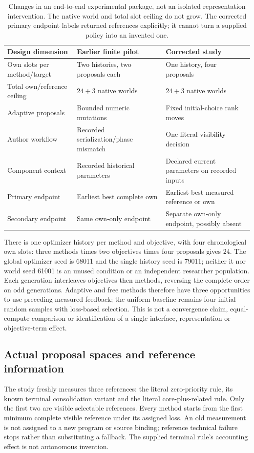 \begin{table}[t]
\centering\small
\setlength{\tabcolsep}{4pt}
\begin{tabular}{>{\raggedright\arraybackslash}p{.28\linewidth}>{\raggedright\arraybackslash}p{.31\linewidth}>{\raggedright\arraybackslash}p{.31\linewidth}}
\toprule
Design dimension & Earlier finite pilot & Corrected study\\
\midrule
Own slots per method/target & Two histories, two proposals each & One history, four proposals\\
Total own/reference ceiling & $24+3$ native worlds & $24+3$ native worlds\\
Adaptive proposals & Bounded numeric mutations & Fixed initial-choice rank moves\\
Author workflow & Recorded serialization/phase mismatch & One literal visibility decision\\
Component context & Recorded historical parameters & Declared current parameters on recorded inputs\\
Primary endpoint & Earliest best complete own & Earliest best measured reference or own\\
Secondary endpoint & Same own-only endpoint & Separate own-only endpoint, possibly absent\\
\bottomrule
\end{tabular}
\caption{Changes in an end-to-end experimental package, not an isolated
representation intervention. The native world and total slot ceiling do not
grow. The corrected primary endpoint labels returned references explicitly;
it cannot turn a supplied policy into an invented one.}
\label{tab:corrected-choice-design}
\end{table}

There is one optimizer history per method and objective, with four chronological
own slots: three methods times two objectives times four proposals gives 24.
The global optimizer seed is 68011 and the single history seed is 79011;
neither it nor world seed 61001 is an unused condition or an independent
researcher population. Each generation interleaves objectives then methods,
reversing the complete order on odd generations. Adaptive and free methods
therefore have three opportunities to use preceding measured feedback; the
uniform baseline remains four initial random samples with loss-based selection.
This is not a convergence claim, equal-compute comparison or identification
of a single interface, representation or objective-term effect.

\subsection{Actual proposal spaces and reference information}
The study freshly measures three references: the literal zero-priority rule,
its known terminal consolidation variant and the literal core-plus-related
rule. Only the first two are visible selectable references. Every method
starts from the first minimum complete visible reference under its assigned
loss. An old measurement is not assigned to a new program or source binding;
reference technical failure stops rather than substituting a fallback.
The supplied terminal rule's accounting effect is not autonomous invention.


